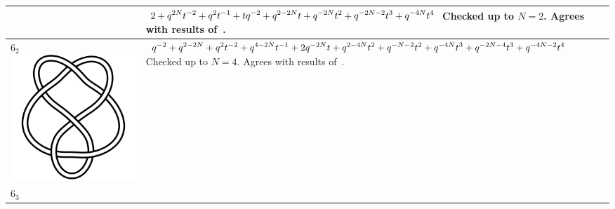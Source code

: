 \documentclass{compositio}
\theoremstyle{definition}
\numberwithin{equation}{section}
\begin{document}
{\begin{longtable}{p{}|p{}}
& 
\newline
$
\displaystyle{%
2+q^{2 N}t^{-2}+q^2 t^{-1}+ t q^{-2} + q^{2-2N} t+q^{-2 N} t^2+q^{-2N-2} t^3+q^{-4 N} t^4
}
$
\newline\newline\newline
Checked up to $N=2$. Agrees with results of~\cite{r0508510, r0607544}. 
\\
\hline
$6_{2}$ 
\includegraphics[scale=0.07,angle=0]{knot6_2.pdf} 
& 
\newline
$
\displaystyle{%
q^{-2} + q^{2-2 N} + q^2t^{-2} + q^{4-2 N} t^{-1} + 2 q^{-2 N} t+q^{2-4 N} t^2+q^{-N-2} t^2+q^{-4 N} t^3+q^{-2N-4} t^3+q^{-4N-2} t^4
}
$
\newline\newline\newline
Checked up to $N=4$. Agrees with results of~\cite{r0508510, r0607544}. 
\\
\hline
$6_{3}$ 

\end{longtable}}
\end{document}

